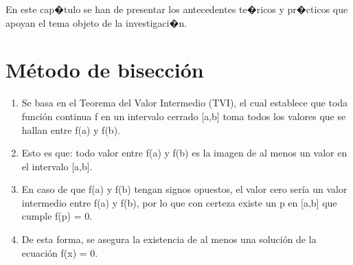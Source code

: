 

En este cap�tulo se han de presentar los antecedentes te�ricos y pr�cticos que
apoyan el tema objeto de la investigaci�n.


\section{Método de bisección}
\begin{enumerate}
 \item
   Se basa en el Teorema del Valor Intermedio (TVI), el cual establece que toda función continua f en un intervalo cerrado [a,b] toma todos los valores que se hallan entre f(a) y f(b). 
 \item
   Esto es que: todo valor entre f(a) y f(b) es la imagen de al menos un valor en el intervalo [a,b]. 
 \item
   En caso de que f(a) y f(b) tengan signos opuestos, el valor cero sería un valor intermedio entre f(a) y f(b), por lo que con certeza existe un p en [a,b] que cumple f(p) = 0. 
 \item
   De esta forma, se asegura la existencia de al menos una solución de la ecuación f(x) = 0.
\end{enumerate}



